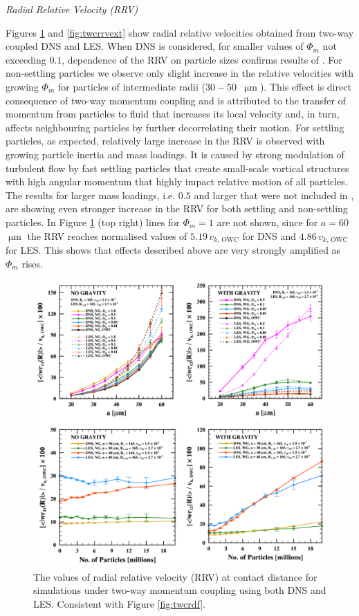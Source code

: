 \documentclass{pracamgren}
\begin{document}
\medskip

\emph{Radial Relative Velocity (RRV)}

Figures \ref{fig:twcrrv} and \ref{fig:twcrrvext} show radial relative velocities obtained from two-way coupled DNS and LES.
When DNS is considered, for smaller values of $\Phi_m$ not exceeding $0.1$, dependence of the RRV on particle sizes confirms results of \textcite[Fig. 22 therein]{Rosa2020}.
For non-settling particles we observe only slight increase in the relative velocities with growing $\Phi_m$ for particles of intermediate radii ($30-50$~$\upmu\text{m}$).
This effect is direct consequence of two-way momentum coupling and is attributed to the transfer of momentum from particles to fluid that increases its local velocity and, in turn, affects neighbouring particles by further decorrelating their motion.
For settling particles, as expected, relatively large increase in the RRV is observed with growing particle inertia and mass loadings.
It is caused by strong modulation of turbulent flow by fast settling particles that create small-scale vortical structures with high angular momentum that highly impact relative motion of all particles.
The results for larger mass loadings, i.e. $0.5$ and larger that were not included in \textcite{Rosa2020}, are showing even stronger increase in the RRV for both settling and non-settling particles.
In Figure \ref{fig:twcrrv} (top right) lines for $\Phi_m=1$ are not shown, since for $a = 60$~$\upmu\text{m}$ the RRV reaches normalised values of $5.19 \, v_{k, \, \text{OWC}}$ for DNS and $4.86 \, v_{k, \, \text{OWC}}$ for LES.
This shows that effects described above are very strongly amplified as $\Phi_m$ rises.

\begin{figure}[h]
\centering
\includegraphics[width=13.5cm]{figures/2-10_twcrrv.pdf}
\caption{
The values of radial relative velocity (RRV) at contact distance for simulations under two-way momentum coupling using both DNS and LES.
Consistent with Figure \ref{fig:twcrdf}.
}
\label{fig:twcrrv}
\end{figure}
\end{document}
